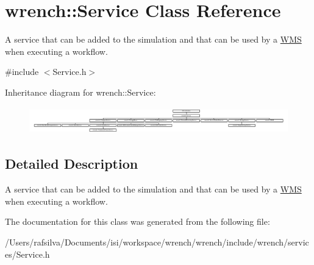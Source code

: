 \hypertarget{classwrench_1_1_service}{}\section{wrench\+:\+:Service Class Reference}
\label{classwrench_1_1_service}


A service that can be added to the simulation and that can be used by a \hyperlink{classwrench_1_1_w_m_s}{W\+MS} when executing a workflow.  




{\ttfamily \#include $<$Service.\+h$>$}

Inheritance diagram for wrench\+:\+:Service\+:\begin{figure}[H]
\begin{center}
\leavevmode
\includegraphics[height=1.187447cm]{classwrench_1_1_service}
\end{center}
\end{figure}


\subsection{Detailed Description}
A service that can be added to the simulation and that can be used by a \hyperlink{classwrench_1_1_w_m_s}{W\+MS} when executing a workflow. 

The documentation for this class was generated from the following file\+:\begin{DoxyCompactItemize}
\item 
/\+Users/rafsilva/\+Documents/isi/workspace/wrench/wrench/include/wrench/services/Service.\+h\end{DoxyCompactItemize}
